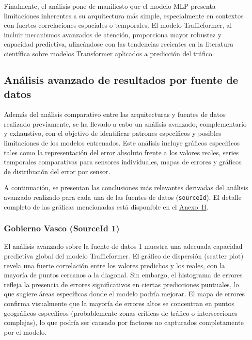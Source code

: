 Finalmente, el análisis pone de manifiesto que el modelo MLP presenta limitaciones inherentes a su arquitectura más simple, especialmente en contextos con fuertes correlaciones espaciales o temporales. El modelo Trafficformer, al incluir mecanismos avanzados de atención, proporciona mayor robustez y capacidad predictiva, alineándose con las tendencias recientes en la literatura científica sobre modelos Transformer aplicados a predicción del tráfico.

\subsection{Análisis avanzado de resultados por fuente de datos}
\label{sec:analisis_avanzado_resultados}

Además del análisis comparativo entre las arquitecturas y fuentes de datos realizado previamente, se ha llevado a cabo un análisis avanzado, complementario y exhaustivo, con el objetivo de identificar patrones específicos y posibles limitaciones de los modelos entrenados. Este análisis incluye gráficos específicos tales como la representación del error absoluto frente a los valores reales, series temporales comparativas para sensores individuales, mapas de errores y gráficos de distribución del error por sensor.

A continuación, se presentan las conclusiones más relevantes derivadas del análisis avanzado realizado para cada una de las fuentes de datos (\texttt{sourceId}). El detalle completo de las gráficas mencionadas está disponible en el \hyperref[anexo:analisis_avanzado]{Anexo~H}.

\subsubsection*{Gobierno Vasco (SourceId 1)}
El análisis avanzado sobre la fuente de datos 1 muestra una adecuada capacidad predictiva global del modelo Trafficformer. El gráfico de dispersión (scatter plot) revela una fuerte correlación entre los valores predichos y los reales, con la mayoría de puntos cercanos a la diagonal. Sin embargo, el histograma de errores refleja la presencia de errores significativos en ciertas predicciones puntuales, lo que sugiere áreas específicas donde el modelo podría mejorar. El mapa de errores confirma visualmente que la mayoría de errores altos se concentran en puntos geográficos específicos (probablemente zonas críticas de tráfico o intersecciones complejas), lo que podría ser causado por factores no capturados completamente por el modelo.

